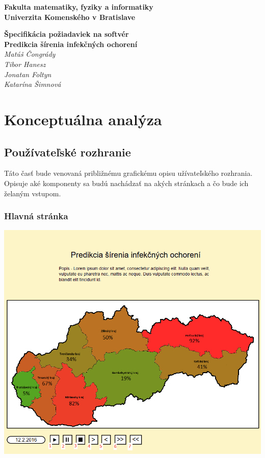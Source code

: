 \documentclass[12pt,a4paper]{report}
\begin{document}
\begin{titlepage}
\centering\bfseries
		Fakulta matematiky, fyziky a informatiky\\Univerzita Komenského v Bratislave	

	\fontsize{23}{28}\textbf{Špecifikácia požiadaviek na softvér}\\
	\fontsize{16}{22}\textbf{Predikcia šírenia infekčných ochorení}\\
	\large\textit{Matúš Čongrády\\Tibor Hanesz\\Jonatan Foltyn\\Katarína Šimnová}

\end{titlepage}\bigskip
	\setcounter{tocdepth}{9}
	\tableofcontents
	
\renewcommand{\chaptername}{}	
\chapter[Konceptuálna analýza]{\rmfamily\bfseries
	Konceptuálna analýza}
	
\section[Používateľské rozhranie]{\rmfamily\bfseries
	Používateľské rozhranie}
Táto  časť  bude  venovaná približnému  grafickému  opisu užívateľského  rozhrania. Opisuje aké komponenty sa budú nachádzať na akých stránkach a čo bude ich želaným vstupom.

\subsection[Hlavná stránka]{\rmfamily\bfseries
	Hlavná stránka}

\includegraphics[scale=0.7]{hl_stranka}
\end{document}
